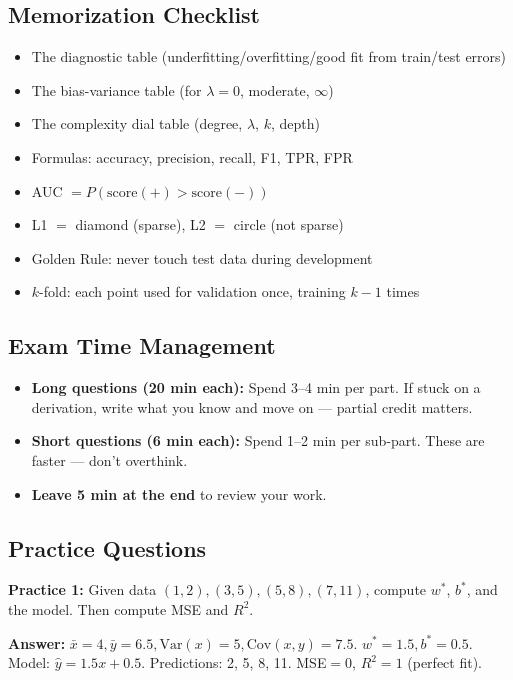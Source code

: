 \documentclass[11pt,a4paper]{article}
\begin{document}
\subsection{Memorization Checklist}

\begin{itemize}
    \item The diagnostic table (underfitting/overfitting/good fit from train/test errors)
    \item The bias-variance table (for $\lambda = 0$, moderate, $\infty$)
    \item The complexity dial table (degree, $\lambda$, $k$, depth)
    \item Formulas: accuracy, precision, recall, F1, TPR, FPR
    \item AUC $= P(\text{score}(+) > \text{score}(-))$
    \item L1 $=$ diamond (sparse), L2 $=$ circle (not sparse)
    \item Golden Rule: never touch test data during development
    \item $k$-fold: each point used for validation once, training $k-1$ times
\end{itemize}

\subsection{Exam Time Management}

\begin{itemize}
    \item \textbf{Long questions (20 min each):} Spend 3--4 min per part. If stuck on a derivation, write what you know and move on --- partial credit matters.
    \item \textbf{Short questions (6 min each):} Spend 1--2 min per sub-part. These are faster --- don't overthink.
    \item \textbf{Leave 5 min at the end} to review your work.
\end{itemize}

\subsection{Practice Questions}

\textbf{Practice 1:} Given data $(1, 2), (3, 5), (5, 8), (7, 11)$, compute $w^*$, $b^*$, and the model. Then compute MSE and $R^2$.

\noindent\textbf{Answer:} $\bar{x}=4, \bar{y}=6.5, \text{Var}(x)=5, \text{Cov}(x,y)=7.5$. $w^*=1.5, b^*=0.5$. Model: $\hat{y}=1.5x+0.5$. Predictions: 2, 5, 8, 11. MSE$=0$, $R^2=1$ (perfect fit).
\end{document}
